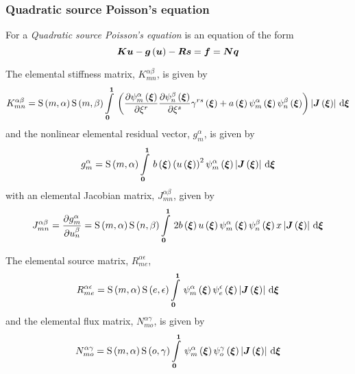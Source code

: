 \subsubsection{Quadratic source Poisson's equation}

For a \emph{Quadratic source Poisson's equation}
 is an equation of the form
\begin{equation}
  \matr{K}\vect{u}-\fnof{\vect{g}}{\vect{u}}-\matr{R}\vect{s}=\vect{f}=\matr{N}\vect{q}
\end{equation}

The elemental stiffness matrix, $K^{\alpha\beta}_{mn}$, is given by
\begin{equation}
  K^{\alpha\beta}_{mn}=\gsf{m}{\alpha}\gsf{m}{\beta}
  \gint{\vectr{0}}{\vectr{1}}{\pbrac{\delby{\gbfn{m}{\alpha}{\vectr{\xi}}}{\xi^{r}}
      \delby{\gbfn{n}{\beta}{\vectr{\xi}}}{\xi^{s}}\fnof{\gamma^{rs}}{\vectr{\xi}}+
      \fnof{a}{\vectr{\xi}}\gbfn{m}{\alpha}{\vectr{\xi}}\gbfn{n}{\beta}{\vectr{\xi}}}
    \abs{\fnof{\matr{J}}{\vectr{\xi}}}}{\vectr{\xi}}
  \label{eqn:elementalfemlhs2}
\end{equation}
and the nonlinear elemental residual vector, $g^{\alpha}_{m}$, is given by
\begin{equation}
  g^{\alpha}_{m}=\gsf{m}{\alpha}\gint{\vectr{0}}{\vectr{1}}{\fnof{b}{\vectr{\xi}}
    \pbrac{\fnof{u}{\vectr{\xi}}}^{2}\gbfn{m}{\alpha}{\vectr{\xi}}\abs{\fnof{\matr{J}}{\vectr{\xi}}}}{\vectr{\xi}}
\end{equation}
with an elemental Jacobian matrix, $J^{\alpha\beta}_{mn}$, given by
\begin{equation}
  J^{\alpha\beta}_{mn}=\delby{g^{\alpha}_{m}}{u^{\beta}_{n}}=\gsf{m}{\alpha}\gsf{n}{\beta}\gint{\vectr{0}}{\vectr{1}}{
    2\fnof{b}{\vectr{\xi}}\fnof{u}{\vectr{\xi}}\gbfn{m}{\alpha}{\vectr{\xi}}\gbfn{n}{\beta}{\vectr{\xi}}
    x\abs{\fnof{\matr{J}}{\vectr{\xi}}}}{\vectr{\xi}}
\end{equation}

The elemental source matrix, $R^{\alpha\epsilon}_{me}$, 
\begin{equation}
  R^{\alpha\epsilon}_{me}=\gsf{m}{\alpha}\gsf{e}{\epsilon}
  \gint{\vectr{0}}{\vectr{1}}{\gbfn{m}{\alpha}{\vectr{\xi}}\gbfn{e}{\epsilon}{\vectr{\xi}}
    \abs{\fnof{\matr{J}}{\vectr{\xi}}}}{\vectr{\xi}}
\end{equation}
and the elemental flux matrix, $N^{\alpha\gamma}_{mo}$, is given by
\begin{equation}
  N^{\alpha\gamma}_{mo} =\gsf{m}{\alpha}\gsf{o}{\gamma}
  \gint{\vectr{0}}{\vectr{1}}{\gbfn{m}{\alpha}{\vectr{\xi}}\gbfn{o}{\gamma}{\vectr{\xi}}
    \abs{\fnof{\matr{J}}{\vectr{\xi}}}}{\vectr{\xi}}
\end{equation}

